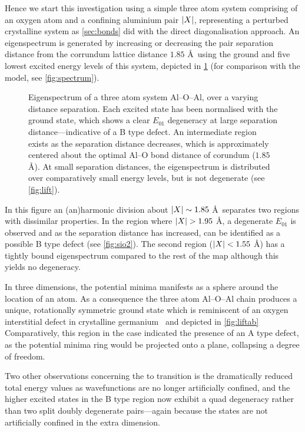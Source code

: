 Hence we start this investigation using a simple three atom system comprising of an oxygen atom and a confining aluminium pair $\lvert X\rvert$, representing a perturbed crystalline system as \cref{sec:bonds} did with the direct diagonalisation approach.
An eigenspectrum is generated by increasing or decreasing the pair separation distance from the corrundum lattice distance $1.85$ \AA\ using the ground and five lowest excited energy levels of this system, depicted in \cref{fig:spect3d} (for comparison with the  model, see \cref{fig:spectrum}).

\begin{figure}[htp]
  \resizebox{0.9\textwidth}{!}{}
  \caption[Three Atom Eigenspectrum in ]{\label{fig:spect3d}Eigenspectrum of a three atom system Al--O--Al, over a varying distance separation. Each excited state has been normalised with the ground state, which shows a clear $E_{01}$ degeneracy at large separation distance---indicative of a B type defect. An intermediate region exists as the separation distance decreases, which is approximately centered about the optimal Al--O bond distance of corundum ($1.85$ \AA). At small separation distances, the eigenspectrum is distributed over comparatively small energy levels, but is not degenerate (see \cref{fig:lift}).}
\end{figure}

In this figure an (an)harmonic division about $\lvert X\rvert \sim 1.85$ \AA\ separates two regions with dissimilar properties.
In the region where $\lvert X\rvert > 1.95$ \AA, a degenerate $E_{01}$ is observed and as the separation distance has increased, can be identified as a possible B type defect (see \cref{fig:sio2}).
The second region ($\lvert X\rvert < 1.55$ \AA) has a tightly bound eigenspectrum compared to the rest of the map although this yields no degeneracy.

In three dimensions, the potential minima manifests as a sphere around the location of an atom. As a consequence the three atom Al--O--Al chain produces a unique, rotationally symmetric ground state which is reminiscent of an oxygen interstitial defect in crystalline germanium~\cite{Artacho1995} and depicted in \cref{fig:liftab}
Comparatively, this region in the  case indicated the presence of an A type defect, as the  potential minima ring would be projected onto a plane, collapsing a degree of freedom.

Two other observations concerning the  to  transition is the dramatically reduced total energy values as wavefunctions are no longer artificially confined, and the higher excited states in the B type region now exhibit a quad degeneracy rather than two split doubly degenerate pairs---again because the states are not artificially confined in the extra dimension.

